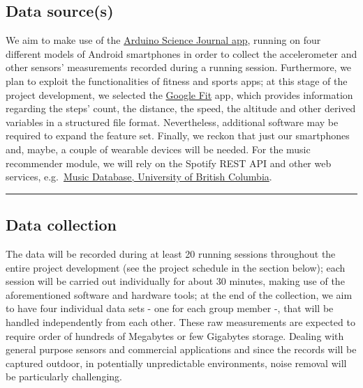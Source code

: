 \documentclass[
  12pt,
]{article}
\begin{document}
\hypertarget{data-sources}{%
\subsection{Data source(s)}\label{data-sources}}

We aim to make use of the
\href{https://play.google.com/store/apps/details?id=cc.arduino.sciencejournal\&hl=en}{Arduino
Science Journal app}, running on four different models of Android
smartphones in order to collect the accelerometer and other sensors'
measurements recorded during a running session. Furthermore, we plan to
exploit the functionalities of fitness and sports apps; at this stage of
the project development, we selected the
\href{https://play.google.com/store/apps/details?id=com.google.android.apps.fitness\&hl=en}{Google
Fit} app, which provides information regarding the steps' count, the
distance, the speed, the altitude and other derived variables in a
structured file format. Nevertheless, additional software may be
required to expand the feature set. Finally, we reckon that just our
smartphones and, maybe, a couple of wearable devices will be needed. For
the music recommender module, we will rely on the Spotify REST API and
other web services,
e.g.~\href{https://www.cs.ubc.ca/~davet/music/index.html}{Music
Database, University of British Columbia}.

\begin{center}\rule{0.5\linewidth}{0.5pt}\end{center}

\hypertarget{data-collection}{%
\subsection{Data collection}\label{data-collection}}

The data will be recorded during at least 20 running sessions throughout
the entire project development (see the project schedule in the section
below); each session will be carried out individually for about 30
minutes, making use of the aforementioned software and hardware tools;
at the end of the collection, we aim to have four individual data sets -
one for each group member -, that will be handled independently from
each other. These raw measurements are expected to require order of
hundreds of Megabytes or few Gigabytes storage. Dealing with general
purpose sensors and commercial applications and since the records will
be captured outdoor, in potentially unpredictable environments, noise
removal will be particularly challenging.
\end{document}
